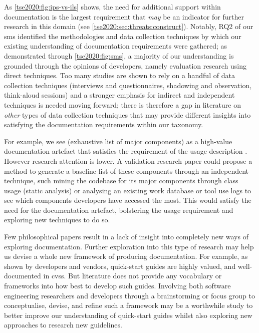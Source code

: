 As \cref{tse2020:fig:ips-vs-ils} shows, the need for additional support  within documentation is the largest requirement that \textit{may} be an indicator for further research in this domain (see \cref{tse2020:sec:threats:construct}). Notably, RQ2 of our \gls{sms} identified the methodologies and data collection techniques by which our existing understanding of  documentation requirements were gathered; as demonstrated through \cref{tse2020:fig:sms}, a majority of our understanding is grounded through the opinions of developers, namely evaluation research using direct techniques. Too many studies are shown to rely on a handful of data collection techniques (interviews and questionnaires, shadowing and observation, think-aloud sessions) and a stronger emphasis for indirect and independent techniques is needed moving forward; there is therefore a gap in literature on \textit{other} types of data collection techniques that may provide different insights into satisfying the documentation requirements within our taxonomy.

For example, we see  (exhaustive list of major  components) as a high-value documentation artefact that satisfies the requirement of the  usage description . However research attention is lower. A validation research paper could propose a method to generate a baseline list of these components through an independent technique, such mining the  codebase for its major components through class usage (static analysis) or analysing an existing work database or tool use logs to see which components developers have accessed the most. This would satisfy the need for the documentation artefact, bolstering the  usage requirement and exploring new techniques to do so.

Few philosophical papers result in a lack of insight into completely new ways of exploring  documentation. Further exploration into this type of research may help us devise a whole new framework of producing  documentation. For example, as shown by developers and vendors, quick-start guides  are highly valued, and well-documented in \glspl{cvs}. But literature does not provide any vocabulary or frameworks into how best to develop such guides. Involving both software engineering researchers and developers through a brainstorming or focus group to conceptualise, devise, and refine such a framework may be a worthwhile study to better improve our understanding of quick-start guides whilst also exploring new approaches to research new guidelines.

